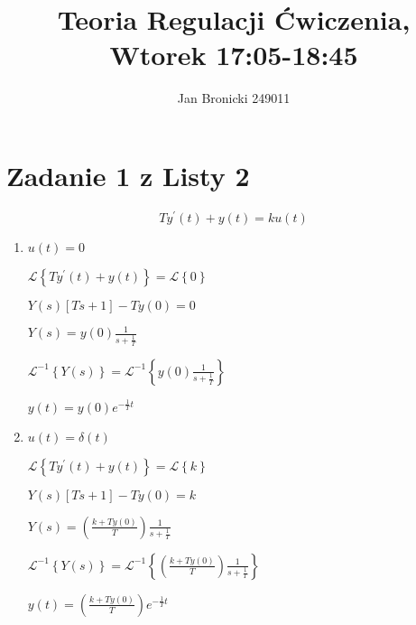 \documentclass{article}
\title{Teoria Regulacji Ćwiczenia, Wtorek 17:05-18:45}
\author{Jan Bronicki 249011 }
\date{}
\begin{document}
\maketitle

\section*{Zadanie 1 z Listy 2}

$$ T y^{\prime}\left(t\right) + y\left(t\right)=k u\left(t\right) $$

\begin{enumerate}[label=\alph*)]

    \item $u\left(t\right)=0$ 
    \begin{flushleft}

        $ \mathcal{L}\left\{T y^{\prime}\left(t\right) + y\left(t\right) \right\}= \mathcal{L}\left\{0\right\} $

        $ Y\left(s\right)\left[Ts+1\right]-Ty\left(0\right) = 0 $

        $ Y\left(s\right) = y\left(0\right)\frac{1}{s+\frac{1}{T}} $

        $ \mathcal{L}^{-1}\left\{Y\left(s\right)\right\} = \mathcal{L}^{-1}\left\{y\left(0\right)\frac{1}{s+\frac{1}{T}}\right\} $

        $ y\left(t\right) = y\left(0\right)e^{-\frac{1}{T}t} $

    \end{flushleft}




    \item $u\left(t\right)=\delta \left(t\right)$
    \begin{flushleft}
        
        $ \mathcal{L}\left\{T y^{\prime}\left(t\right) + y\left(t\right) \right\}= \mathcal{L}\left\{k\right\} $

        $ Y\left(s\right)\left[Ts+1\right]-Ty\left(0\right) = k $

        $ Y\left(s\right) = \left(\frac{k+Ty\left(0\right)}{T}\right)\frac{1}{s+\frac{1}{T}} $

        $ \mathcal{L}^{-1}\left\{Y\left(s\right)\right\} = \mathcal{L}^{-1}\left\{\left(\frac{k+Ty\left(0\right)}{T}\right)\frac{1}{s+\frac{1}{T}}\right\} $

        $ y\left(t\right) = \left(\frac{k+Ty\left(0\right)}{T}\right)e^{-\frac{1}{T}t} $

    \end{flushleft}
    



\end{enumerate}
\end{document}
